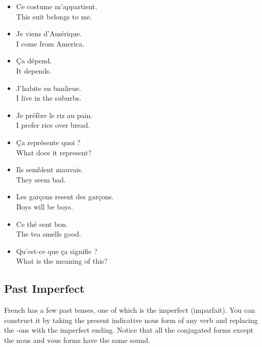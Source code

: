 \begin{itemize}
  \item  Ce costume m'appartient. \\ This suit belongs to me. 
	\item  Je viens d'Am{\'e}rique. \\ I come from America.
	\item  {\c C}a d{\'e}pend. \\ It depends.
	\item  J'habite en banlieue. \\ I live in the suburbs.
	\item  Je pr{\'e}f{\`e}re le riz au pain. \\ I prefer rice over bread.
	\item  {\c C}a repr{\'e}sente quoi ? \\ What does it represent?
	\item  Ils semblent mauvais. \\ They seem bad.
	\item  Les gar{\c c}ons resent des gar{\c c}ons. \\ Boys will be boys.
	\item  Ce th{\'e} sent bon. \\ The tea smells good.
	\item  Qu'est-ce que {\c c}a signifie ? \\ What is the meaning of this?
\end{itemize}


\pagebreak
\subsection{Past Imperfect}

French has a few past tenses, one of which is the imperfect (imparfait). You can construct it by taking the present indicative nous form of any verb and replacing the -ons with the imperfect ending. Notice that all the conjugated forms except the nous and vous forms have the same sound.

